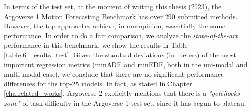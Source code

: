 In terms of the test set, at the moment of writing this thesis (2023), the Argoverse 1 Motion Forecasting Benchmark \cite{chang2019argoverse} has over 290 submitted methods. However, the top approaches achieve, in our opinion, essentially the same performance. In order to do a fair comparison, we analyze the \textit{state-of-the-art} performance in this benchmark, we show the results in Table \ref{table:6_results_test}. Given the standard deviations (in meters) of the most important regression metrics (\ac{minADE} and \ac{minFDE}, both in the uni-modal and multi-modal case), we conclude that there are no significant performance differences for the top-25 models. In fact, as stated in Chapter \ref{cha:related_works}, Argoverse 2 \cite{wilson2023argoverse} explicitly mentions that there is a \textit{"goldilocks zone"} of task difficulty in the Argoverse 1 test set, since it has begun to plateau.

